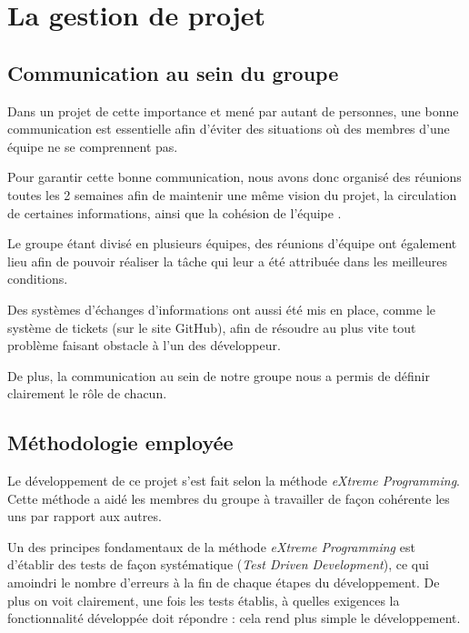 \section{La gestion de projet}

  \subsection{Communication au sein du groupe}

    Dans un projet de cette importance et mené par autant de personnes, une
    bonne communication est essentielle afin d'éviter des situations où des
    membres d'une équipe ne se comprennent pas.

    Pour garantir cette bonne communication, nous avons donc organisé des
    réunions toutes les 2 semaines afin de maintenir une même vision du projet,
    la circulation de certaines informations, ainsi que la cohésion de l'équipe
    .

    Le groupe étant divisé en plusieurs équipes, des réunions d'équipe ont
    également lieu afin de pouvoir réaliser la tâche qui leur a été attribuée
    dans les meilleures conditions.

    Des systèmes d'échanges d'informations ont aussi été mis en place, comme le
    système de tickets (sur le site GitHub), afin de résoudre au plus vite tout
    problème faisant obstacle à l'un des développeur.

    De plus, la communication au sein de notre groupe nous a permis de définir
    clairement le rôle de chacun.


  \subsection{Méthodologie employée}

    Le développement de ce projet s'est fait selon la méthode \emph{eXtreme
    Programming}. Cette méthode a aidé les membres du groupe à travailler de
    façon cohérente les uns par rapport aux autres.

    Un des principes fondamentaux de la méthode \emph{eXtreme Programming} est
    d'établir des tests de façon systématique (\emph{Test Driven Development}),
    ce qui amoindri le nombre d'erreurs à la fin de chaque étapes du
    développement. De plus on voit clairement, une fois les tests établis, à
    quelles exigences la fonctionnalité développée doit répondre : cela rend
    plus simple le développement.

